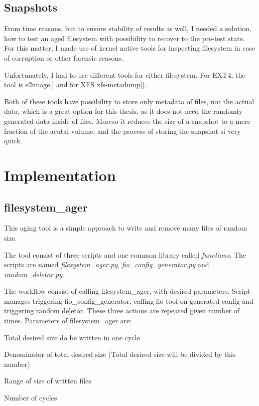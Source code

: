 \documentclass[
  color, %
  table, %
  lof,   %
  lot,   %
]{fithesis3}
\begin{document}
\section{Snapshots}
From time reasons, but to ensure stability of results as well, I needed a solution, how to test an aged filesystem with possibility to recover to the pre-test state. For this matter, I made use of kernel native tools for inspecting filesystem in case of corruption or other forensic reasons.

Unfortunately, I had to use different tools for either filesystem. For EXT4, the tool is e2image[] and for XFS xfs-metadump[].

Both of these tools have possibility to store only metadata of files, not the actual data, which is a great option for this thesis, as it does not need the randomly generated data inside of files. Moreso it reduces the size of a snapshot to a mere fraction of the acutal volume, and the process of storing the snapshot si very quick.


\chapter{Implementation}
\section{filesystem\_ager}
This aging tool is a simple approach to write and remove many files of random size.

The tool consist of three scripts and one common library called \textit{functions}. The scripts are named \textit{filesystem\_ager.py}, \textit{fio\_config\_generator.py} and \textit{random\_deletor.py}.

The workflow consist of calling filesystem\_ager, with desired parameters. Script manages triggering fio\_config\_generator, calling fio tool on generated config and triggering random deletor. These three actions are repeated given number of times.
Parameters of filesystem\_ager are: 
\begin{compactenum}
  \item Total desired size do be written in one cycle
  \item Denominator of total desired size (Total desired size will be divided by this number)
  \item Range of size of written files
  \item Number of cycles
\end{compactenum}
\end{document}
